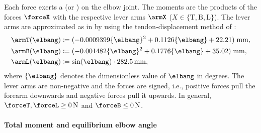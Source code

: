 Each force exerts a  (or ) on the elbow joint.
The moments are the products of the forces $\forceX$
with the respective lever arms $\armX$
($X \in \{\mathrm{T}, \mathrm{B}, \mathrm{L}\}$).
The lever arms are approximated as in
 by using
the tendon-displacement method of \cite{An84Determination}:
\begin{subequations}
  \begin{align}
    \armT(\elbang)
    &\ceq (-0.0009399 \{\elbang\}^2 + 0.1126 \{\elbang\} + 22.21)\;
    \si{\milli\meter},\\
    \armB(\elbang)
    &\ceq (-0.001482 \{\elbang\}^2 + 0.1776 \{\elbang\} + 35.02)\;
    \si{\milli\meter},\\
    \armL(\elbang)
    &\ceq \sin(\elbang) \cdot \SI{282.5}{\milli\meter},
  \end{align}
\end{subequations}
where $\{\elbang\}$ denotes the dimensionless value of $\elbang$
in degrees.
The lever arms are non-negative and the forces are signed, i.e.,
positive forces pull the forearm downwards and
negative forces pull it upwards.
In general, $\forceT, \forceL \ge \SI{0}{\newton}$ and
$\forceB \le \SI{0}{\newton}$.

\paragraph{Total moment and equilibrium elbow angle}

